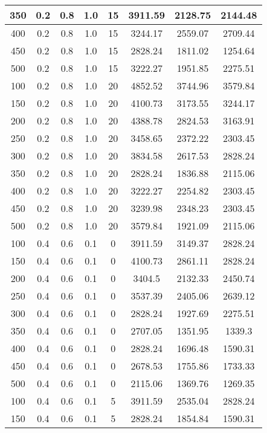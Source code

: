 \documentclass[a4paper, 12pt]{extreport}
\begin{document}
\begin{itemize}
\begin{longtable}{|c|c|c|c|c|c|c|c|}
			350 & 0.2 & 0.8 & 1.0 & 15 & 3911.59 & 2128.75 & 2144.48 \\\hline
			400 & 0.2 & 0.8 & 1.0 & 15 & 3244.17 & 2559.07 & 2709.44 \\\hline
			450 & 0.2 & 0.8 & 1.0 & 15 & 2828.24 & 1811.02 & 1254.64 \\\hline
			500 & 0.2 & 0.8 & 1.0 & 15 & 3222.27 & 1951.85 & 2275.51 \\\hline
			100 & 0.2 & 0.8 & 1.0 & 20 & 4852.52 & 3744.96 & 3579.84 \\\hline
			150 & 0.2 & 0.8 & 1.0 & 20 & 4100.73 & 3173.55 & 3244.17 \\\hline
			200 & 0.2 & 0.8 & 1.0 & 20 & 4388.78 & 2824.53 & 3163.91 \\\hline
			250 & 0.2 & 0.8 & 1.0 & 20 & 3458.65 & 2372.22 & 2303.45 \\\hline
			300 & 0.2 & 0.8 & 1.0 & 20 & 3834.58 & 2617.53 & 2828.24 \\\hline
			350 & 0.2 & 0.8 & 1.0 & 20 & 2828.24 & 1836.88 & 2115.06 \\\hline
			400 & 0.2 & 0.8 & 1.0 & 20 & 3222.27 & 2254.82 & 2303.45 \\\hline
			450 & 0.2 & 0.8 & 1.0 & 20 & 3239.98 & 2348.23 & 2303.45 \\\hline
			500 & 0.2 & 0.8 & 1.0 & 20 & 3579.84 & 1921.09 & 2115.06 \\\hline
			100 & 0.4 & 0.6 & 0.1 & 0 & 3911.59 & 3149.37 & 2828.24 \\\hline
			150 & 0.4 & 0.6 & 0.1 & 0 & 4100.73 & 2861.11 & 2828.24 \\\hline
			200 & 0.4 & 0.6 & 0.1 & 0 & 3404.5 & 2132.33 & 2450.74 \\\hline
			250 & 0.4 & 0.6 & 0.1 & 0 & 3537.39 & 2405.06 & 2639.12 \\\hline
			300 & 0.4 & 0.6 & 0.1 & 0 & 2828.24 & 1927.69 & 2275.51 \\\hline
			350 & 0.4 & 0.6 & 0.1 & 0 & 2707.05 & 1351.95 & 1339.3 \\\hline
			400 & 0.4 & 0.6 & 0.1 & 0 & 2828.24 & 1696.48 & 1590.31 \\\hline
			450 & 0.4 & 0.6 & 0.1 & 0 & 2678.53 & 1755.86 & 1733.33 \\\hline
			500 & 0.4 & 0.6 & 0.1 & 0 & 2115.06 & 1369.76 & 1269.35 \\\hline
			100 & 0.4 & 0.6 & 0.1 & 5 & 3911.59 & 2535.04 & 2828.24 \\\hline
			150 & 0.4 & 0.6 & 0.1 & 5 & 2828.24 & 1854.84 & 1590.31 \\\hline

\end{longtable}
\end{itemize}
\end{document}
